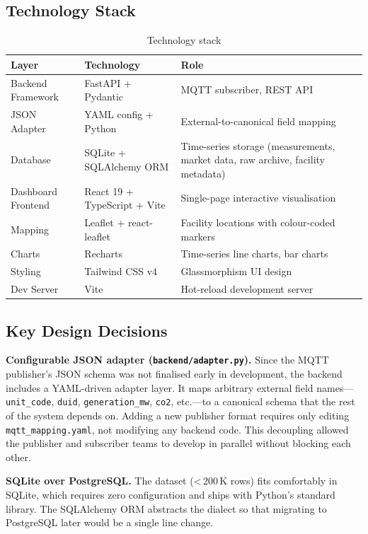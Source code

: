 \documentclass[11pt,a4paper]{article}
\begin{document}
\subsection{Technology Stack}

\begin{table}[H]
\centering
\caption{Technology stack}
\begin{tabular}{lll}
\toprule
\textbf{Layer} & \textbf{Technology} & \textbf{Role} \\
\midrule
Backend Framework & FastAPI + Pydantic & MQTT subscriber, REST API \\
JSON Adapter & YAML config + Python & External-to-canonical field mapping \\
Database & SQLite + SQLAlchemy ORM & Time-series storage (measurements, market data, raw archive, facility metadata) \\
Dashboard Frontend & React 19 + TypeScript + Vite & Single-page interactive visualisation \\
Mapping & Leaflet + react-leaflet & Facility locations with colour-coded markers \\
Charts & Recharts & Time-series line charts, bar charts \\
Styling & Tailwind CSS v4 & Glassmorphism UI design \\
Dev Server & Vite & Hot-reload development server \\
\bottomrule
\end{tabular}
\end{table}

\subsection{Key Design Decisions}

\textbf{Configurable JSON adapter (\texttt{backend/adapter.py}).}
Since the MQTT publisher's JSON schema was not finalised early in development, the backend includes a YAML-driven adapter layer. It maps arbitrary external field names---\texttt{unit\_code}, \texttt{duid}, \texttt{generation\_mw}, \texttt{co2}, etc.---to a canonical schema that the rest of the system depends on. Adding a new publisher format requires only editing \texttt{mqtt\_mapping.yaml}, not modifying any backend code. This decoupling allowed the publisher and subscriber teams to develop in parallel without blocking each other.

\textbf{SQLite over PostgreSQL.}
The dataset (\textless\,200\,K rows) fits comfortably in SQLite, which requires zero configuration and ships with Python's standard library. The SQLAlchemy ORM abstracts the dialect so that migrating to PostgreSQL later would be a single line change.
\end{document}
